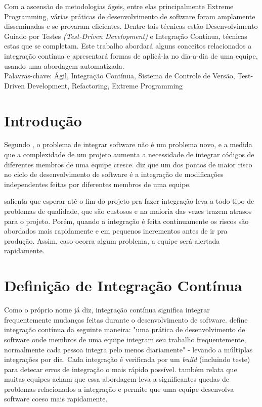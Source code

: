 \documentclass[10pt,a4paper,font=plain]{abnt}
\date{04 de março de 2010}
\begin{document}
\maketitle

\begin{resumo}
Com a ascensão de metodologias ágeis, entre elas principalmente Extreme Programming, várias práticas de desenvolvimento de software foram amplamente disseminadas e se provaram eficientes. Dentre tais técnicas estão Desenvolvimento Guiado por Testes \textit{(Test-Driven Development)}  e Integração Contínua, técnicas estas que se completam. Este trabalho abordará alguns conceitos relacionados a integração contínua e apresentará formas de aplicá-la no dia-a-dia de uma equipe, usando uma abordagem automatizada.\\

Palavras-chave: Ágil, Integração Contínua, Sistema de Controle de Versão, Test-Driven Development, Refactoring, Extreme Programming
\end{resumo}



\section{Introdução}

Segundo , o problema de integrar software não é um problema novo, e a medida que a complexidade de um projeto aumenta a necessidade de integrar códigos de diferentes membros de uma equipe cresce.  diz que um dos pontos de maior risco no ciclo de desenvolvimento de software é a integração de modificações independentes feitas por diferentes membros de uma equipe.

 salienta que esperar até o fim do projeto pra fazer integração leva a todo tipo de problemas de qualidade, que são custosos e na maioria das vezes trazem atrasos para o projeto. Porém, quando a integração é feita continuamente os riscos são abordados mais rapidamente e em pequenos incrementos antes de ir pra produção. Assim, caso ocorra algum problema, a equipe será alertada rapidamente.



\section{Definição de Integração Contínua}

Como o próprio nome já diz, integração contínua significa integrar frequentemente mudanças feitas durante o desenvolvimento de software.
 define integração contínua da seguinte maneira: "uma prática de desenvolvimento de software onde membros de uma equipe integram seu trabalho frequentemente, normalmente cada pessoa integra pelo menos diariamente" - levando a múltiplas integrações por dia. Cada integração é verificada por um \textit{build} (incluindo teste) para detecar erros de integração o mais rápido possível.  também relata que muitas equipes acham que essa abordagem leva a significantes quedas de problemas relacionados a integração e permite que uma equipe desenvolva software coeso mais rapidamente.
\end{document}
